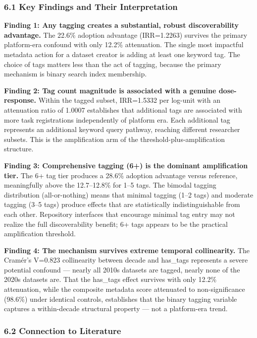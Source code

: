 
\subsubsection{6.1 Key Findings and Their Interpretation}

\textbf{Finding 1: Any tagging creates a substantial, robust discoverability advantage.} The 22.6\% adoption advantage (IRR=1.2263) survives the primary platform-era confound with only 12.2\% attenuation. The single most impactful metadata action for a dataset creator is adding at least one keyword tag. The choice of tags matters less than the act of tagging, because the primary mechanism is binary search index membership.

\textbf{Finding 2: Tag count magnitude is associated with a genuine dose-response.} Within the tagged subset, IRR=1.5332 per log-unit with an attenuation ratio of 1.0007 establishes that additional tags are associated with more task registrations independently of platform era. Each additional tag represents an additional keyword query pathway, reaching different researcher subsets. This is the amplification arm of the threshold-plus-amplification structure.

\textbf{Finding 3: Comprehensive tagging (6+) is the dominant amplification tier.} The 6+ tag tier produces a 28.6\% adoption advantage versus reference, meaningfully above the 12.7--12.8\% for 1--5 tags. The bimodal tagging distribution (all-or-nothing) means that minimal tagging (1--2 tags) and moderate tagging (3--5 tags) produce effects that are statistically indistinguishable from each other. Repository interfaces that encourage minimal tag entry may not realize the full discoverability benefit; 6+ tags appears to be the practical amplification threshold.

\textbf{Finding 4: The mechanism survives extreme temporal collinearity.} The Cramér's V=0.823 collinearity between decade and has\_tags represents a severe potential confound --- nearly all 2010s datasets are tagged, nearly none of the 2020s datasets are. That the has\_tags effect survives with only 12.2\% attenuation, while the composite metadata score attenuated to non-significance (98.6\%) under identical controls, establishes that the binary tagging variable captures a within-decade structural property --- not a platform-era trend.

\subsubsection{6.2 Connection to Literature}

